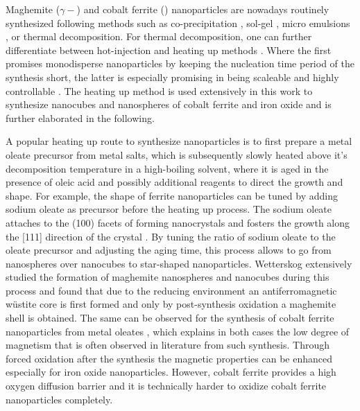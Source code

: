 \documentclass[\main/dresen_thesis.tex]{subfiles}
\begin{document}
  Maghemite ($\gamma-$) and cobalt ferrite () nanoparticles are nowadays routinely synthesized following methods such as co-precipitation \cite{Fried_2001_Order}, sol-gel \cite{Niederberger_2009_Metal}, micro emulsions \cite{Pillai_1996_Synth}, or thermal decomposition.
  For thermal decomposition, one can further differentiate between hot-injection \cite{Hyeon_2003_Chemi} and heating up methods \cite{Embden_2015_TheHe}.
  Where the first promises monodisperse nanoparticles by keeping the nucleation time period of the synthesis short, the latter is especially promising in being scaleable and highly controllable \cite{Park_2004_Ultra}.
  The heating up method is used extensively in this work to synthesize nanocubes and nanospheres of cobalt ferrite and iron oxide and is further elaborated in the following.

  A popular heating up route to synthesize nanoparticles is to first prepare a metal oleate precursor from metal salts, which is subsequently slowly heated above it's decomposition temperature in a high-boiling solvent, where it is aged in the presence of oleic acid and possibly additional reagents to direct the growth and shape.
  For example, the shape of ferrite nanoparticles can be tuned by adding sodium oleate as precursor before the heating up process.
  The sodium oleate attaches to the (100) facets of forming nanocrystals and fosters the growth along the [111] direction of the crystal \cite{Bao_2009_Forma}.
  By tuning the ratio of sodium oleate to the oleate precursor and adjusting the aging time, this process allows to go from nanospheres over nanocubes to star-shaped nanoparticles.
  Wetterskog \etal extensively studied the formation of maghemite nanospheres and nanocubes during this process \cite{Wetterskog_2014_Preci, Wetterskog_2013_Anoma} and found that due to the reducing environment an antiferromagnetic w\"ustite core is first formed and only by post-synthesis oxidation a maghemite shell is obtained.
  The same can be observed for the synthesis of cobalt ferrite nanoparticles from metal oleates \cite{Bodnarchuk_2009_Excha}, which explains in both cases the low degree of magnetism that is often observed in literature from such synthesis.
  Through forced oxidation after the synthesis the magnetic properties can be enhanced especially for iron oxide nanoparticles.
  However, cobalt ferrite provides a high oxygen diffusion barrier \cite{Chen_2015_Synth} and it is technically harder to oxidize cobalt ferrite nanoparticles completely.
\end{document}
